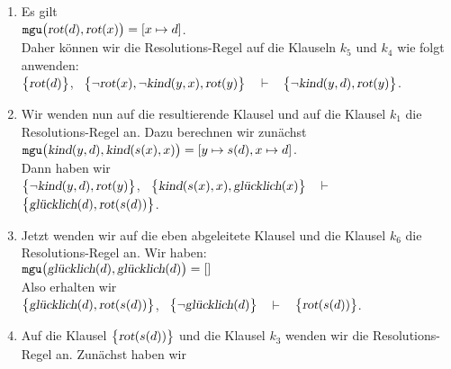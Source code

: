 \begin{enumerate}
\item Es gilt 
      \\[0.2cm]
      \hspace*{1.3cm}
      $\mathtt{mgu}\bigl(\textsl{rot}(d), \textsl{rot}(x)\bigr) = [x \mapsto d]$.
      \\[0.2cm]
      Daher k\"{o}nnen wir die Resolutions-Regel auf die Klauseln $k_5$ und $k_4$ wie folgt anwenden:
      \\[0.2cm]
      \hspace*{1.3cm}
      $\bigl\{\textsl{rot}(d)\bigl\}$, \ $\bigl\{\neg \textsl{rot}(x), \neg \textsl{kind}(y,x),
       \textsl{rot}(y)\bigl\}$ \ $\vdash$ \ $\bigl\{\neg \textsl{kind}(y,d), \textsl{rot}(y)\bigl\}$.
\item Wir wenden nun auf die resultierende Klausel und auf die Klausel $k_1$ die
      Resolutions-Regel an.  Dazu berechnen wir zun\"{a}chst
      \\[0.2cm]
      \hspace*{1.3cm}
      $\mathtt{mgu}\bigl(\textsl{kind}(y,d), \textsl{kind}(s(x),x)\bigr) = 
       [y \mapsto s(d), x \mapsto d]$.
      \\[0.2cm]
      Dann haben wir
      \\[0.2cm]
      \hspace*{1.3cm}
       $\bigl\{\neg \textsl{kind}(y,d), \textsl{rot}(y)\bigl\}$, \ 
       $\bigl\{\textsl{kind}(s(x),x), \textsl{gl\"{u}cklich}(x)\bigl\}$ \ $\vdash$ \ 
       $\bigl\{\textsl{gl\"{u}cklich}(d), \textsl{rot}(s(d))\bigl\}$.
\item Jetzt wenden wir auf die eben abgeleitete Klausel und die Klausel $k_6$ die
      Resolutions-Regel an.  Wir haben:
      \\[0.2cm]
      \hspace*{1.3cm}
      $\mathtt{mgu}\bigl(\textsl{gl\"{u}cklich}(d), \textsl{gl\"{u}cklich}(d)\bigr) = []$
      \\[0.2cm]
      Also erhalten wir
      \\[0.2cm]
      \hspace*{1.3cm}
      $\bigl\{\textsl{gl\"{u}cklich}(d), \textsl{rot}(s(d))\bigl\}$, \ $\bigl\{\neg \textsl{gl\"{u}cklich}(d)\bigl\}$ \ $\vdash$ \ $\bigl\{\textsl{rot}(s(d))\bigl\}$.
\item Auf die Klausel $\bigl\{\textsl{rot}(s(d))\bigl\}$ und die Klausel $k_3$ wenden wir
      die Resolutions-Regel an.  Zun\"{a}chst haben wir
      \\[0.2cm]
      \hspace*{1.3cm}

\end{enumerate}

